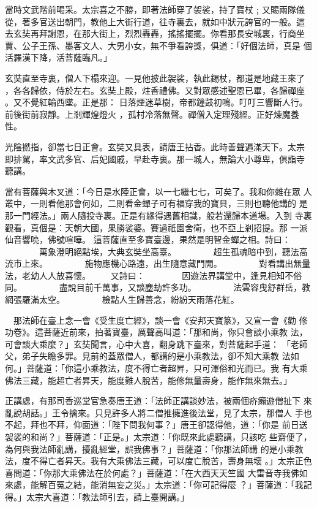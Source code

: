 \begin{pinyinscope}
{當時文武階前喝采。太宗喜之不勝，即著法師穿了袈裟，持了寶杖﹔又賜兩隊儀
從，著多官送出朝門，教他上大街行道，往寺裏去，就如中狀元誇官的一般。這
去玄奘再拜謝恩，在那大街上，烈烈轟轟，搖搖擺擺。你看那長安城裏，行商坐
賈、公子王孫、墨客文人、大男小女，無不爭看誇獎，俱道：「好個法師，真是
個活羅漢下降，活菩薩臨凡。」

玄奘直至寺裏，僧人下榻來迎。一見他披此袈裟，執此錫杖，都道是地藏王來了
，各各歸依，侍於左右。玄奘上殿，炷香禮佛。又對眾感述聖恩已畢，各歸禪座
。又不覺紅輪西墜。正是那：
日落煙迷草樹，帝都鐘鼓初鳴。叮叮三響斷人行。前後街前寂靜。上剎輝煌燈火
，孤村冷落無聲。禪僧入定理殘經。正好煉魔養性。

光陰撚指，卻當七日正會。玄奘又具表，請唐王拈香。此時善聲遍滿天下。太宗
即排駕，率文武多官、后妃國戚，早赴寺裏。那一城人，無論大小尊卑，俱詣寺
聽講。

當有菩薩與木叉道：「今日是水陸正會，以一七繼七七，可矣了。我和你雜在眾
人叢中，一則看他那會何如，二則看金蟬子可有福穿我的寶貝，三則也聽他講的
是那一門經法。」兩人隨投寺裏。正是有緣得遇舊相識，般若還歸本道場。入到
寺裏觀看，真個是：天朝大國，果勝裟婆。賽過祇園舍衛，也不亞上剎招提。那
一派仙音響喨，佛號喧嘩。
這菩薩直至多寶臺邊，果然是明智金蟬之相。詩曰：
　　　　萬象澄明絕點埃，大典玄奘坐高臺。
　　　　超生孤魂暗中到，聽法高流市上來。
　　　　施物應機心路遠，出生隨意藏門開。
　　　　對看講出無量法，老幼人人放喜懷。
　　又詩曰：
　　　　因遊法界講堂中，逢見相知不俗同。
　　　　盡說目前千萬事，又談塵劫許多功。
　　　　法雲容曳舒群岳，教網張羅滿太空。
　　　　檢點人生歸善念，紛紛天雨落花紅。

　那法師在臺上念一會《受生度亡經》，談一會《安邦天寶篆》，又宣一會《勸
修功卷》。這菩薩近前來，拍著寶臺，厲聲高叫道：「那和尚，你只會談小乘教
法，可會談大乘麼？」玄奘聞言，心中大喜，翻身跳下臺來，對菩薩起手道：
「老師父，弟子失瞻多罪。見前的蓋眾僧人，都講的是小乘教法，卻不知大乘教
法如何。」菩薩道：「你這小乘教法，度不得亡者超昇，只可渾俗和光而已。我
有大乘佛法三藏，能超亡者昇天，能度難人脫苦，能修無量壽身，能作無來無去。」

正講處，有那司香巡堂官急奏唐王道：「法師正講談妙法，被兩個疥癩遊僧扯下
來亂說胡話。」王令擒來。只見許多人將二僧推擁進後法堂，見了太宗，那僧人
手也不起，拜也不拜，仰面道：「陛下問我何事？」唐王卻認得他，道：「你是
前日送袈裟的和尚？」菩薩道：「正是。」太宗道：「你既來此處聽講，只該吃
些齋便了，為何與我法師亂講，擾亂經堂，誤我佛事？」菩薩道：「你那法師講
的是小乘教法，度不得亡者昇天。我有大乘佛法三藏，可以度亡脫苦，壽身無壞
。」太宗正色喜問道：「你那大乘佛法在於何處？」菩薩道：「在大西天天竺國
大雷音寺我佛如來處，能解百冤之結，能消無妄之災。」太宗道：「你可記得麼
？」菩薩道：「我記得。」太宗大喜道：「教法師引去，請上臺開講。」

}
\end{pinyinscope}
